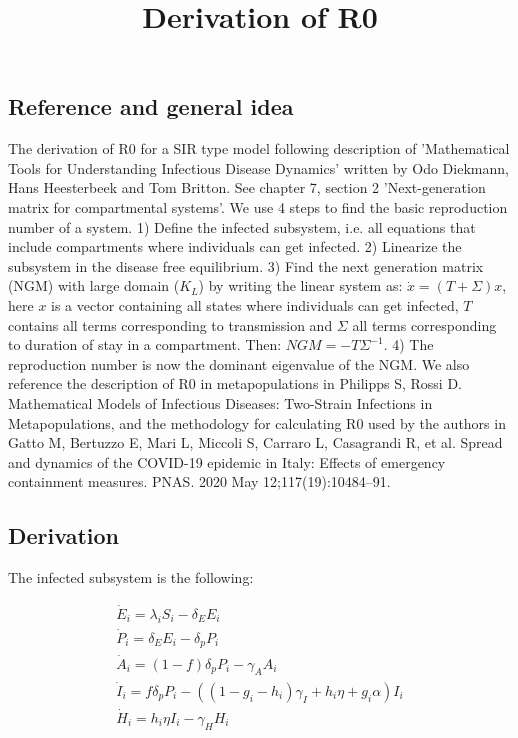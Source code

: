 \documentclass{article}
\title{Derivation of R0}
\begin{document}
\maketitle

\subsection*{Reference and general idea}

The derivation of R0 for a SIR type model following description of 'Mathematical Tools for Understanding Infectious Disease Dynamics' written by Odo Diekmann, Hans Heesterbeek and Tom Britton. 
See chapter 7, section 2 'Next-generation matrix for compartmental systems'. 
We use 4 steps to find the basic reproduction number of a system.
1) Define the infected subsystem, i.e. all equations that include compartments where individuals can get infected. 
2) Linearize the subsystem in the disease free equilibrium. 
3) Find the next generation matrix (NGM) with large domain ($K_L$) by writing the linear system as: $\dot{x} = (T + \Sigma) x$, here $x$ is a vector containing all states where individuals can get infected, $T$ contains all terms corresponding to transmission and $\Sigma$ all terms corresponding to duration of stay in a compartment. Then: $NGM = -T \Sigma^{-1}. $
4) The reproduction number is now the dominant eigenvalue of the NGM. 
We also reference the description of R0 in metapopulations in Philipps S, Rossi D. Mathematical Models of Infectious Diseases: Two-Strain Infections in Metapopulations, and the methodology for calculating R0 used by the authors in Gatto M, Bertuzzo E, Mari L, Miccoli S, Carraro L, Casagrandi R, et al. Spread and dynamics of the COVID-19 epidemic in Italy: Effects of emergency containment measures. PNAS. 2020 May 12;117(19):10484–91.


\subsection*{Derivation}

The infected subsystem is the following: 

\begin{gather*}
    \dot{E}_i =  \lambda_i S_i - \delta_E E_i \\
    \dot{P}_i = \delta_E E_i - \delta_p P_i \\
    \dot{A}_i = (1-f) \delta_p P_i - \gamma_A A_i \\
    \dot{I}_i = f \delta_p P_i - ((1-g_i-h_i) \gamma_{I} + h_i \eta + g_i \alpha) I_i \\   
    \dot{H}_i = h_i \eta I_i - \gamma_H H_i   
\end{gather*}
\end{document}
